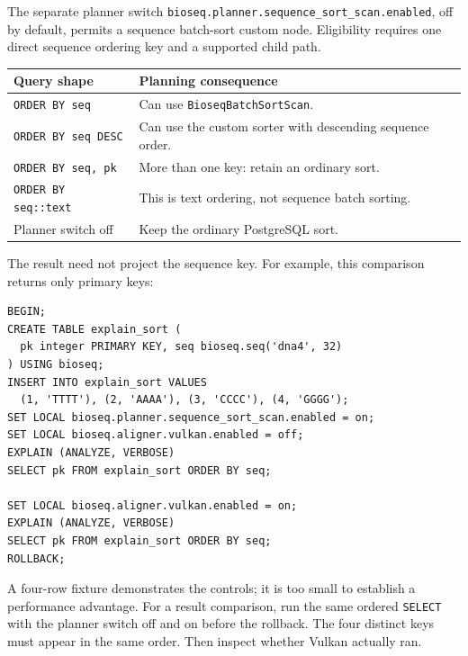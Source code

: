 The separate planner switch
\nolinkurl{bioseq.planner.sequence_sort_scan.enabled}, off by default,
permits a sequence batch-sort custom node. Eligibility requires one direct
sequence ordering key and a supported child path.

\begingroup\small
\begin{longtable}{@{}p{.41\linewidth}p{.54\linewidth}@{}}
\toprule
\textbf{Query shape} & \textbf{Planning consequence}\\
\midrule\endhead
\texttt{ORDER BY seq} & Can use \texttt{BioseqBatchSortScan}.\\
\texttt{ORDER BY seq DESC} & Can use the custom sorter with descending
sequence order.\\
\texttt{ORDER BY seq, pk} & More than one key: retain an ordinary sort.\\
\texttt{ORDER BY seq::text} & This is text ordering, not sequence batch
sorting.\\
Planner switch off & Keep the ordinary PostgreSQL sort.\\
\bottomrule
\end{longtable}
\endgroup

The result need not project the sequence key. For example, this comparison
returns only primary keys:

\par\noindent\begin{minipage}{\linewidth}
\begin{lstlisting}[style=bioseq-appendix-sql]
BEGIN;
CREATE TABLE explain_sort (
  pk integer PRIMARY KEY, seq bioseq.seq('dna4', 32)
) USING bioseq;
INSERT INTO explain_sort VALUES
  (1, 'TTTT'), (2, 'AAAA'), (3, 'CCCC'), (4, 'GGGG');
SET LOCAL bioseq.planner.sequence_sort_scan.enabled = on;
SET LOCAL bioseq.aligner.vulkan.enabled = off;
EXPLAIN (ANALYZE, VERBOSE)
SELECT pk FROM explain_sort ORDER BY seq;

SET LOCAL bioseq.aligner.vulkan.enabled = on;
EXPLAIN (ANALYZE, VERBOSE)
SELECT pk FROM explain_sort ORDER BY seq;
ROLLBACK;
\end{lstlisting}
\end{minipage}

A four-row fixture demonstrates the controls; it is too small to establish a
performance advantage. For a result comparison, run the same ordered
\texttt{SELECT} with the planner switch off and on before the rollback.
The four distinct keys must appear in the same order. Then inspect whether
Vulkan actually ran.

